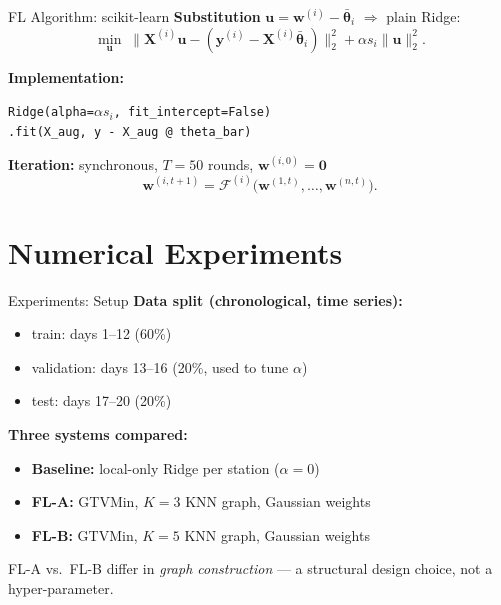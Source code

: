 \documentclass[12pt]{beamer}
\newcommand{\nodeidx}{i}
\newcommand{\nrnodes}{n}
\newcommand{\iteridx}{t}
\newcommand{\fixedpointop}{\mathcal{F}}
\newcommand{\featuremtx}{\mathbf{X}}
\newcommand{\labelvec}{\mathbf{y}}
\newcommand{\localparams}[1]{\mathbf{w}^{(#1)}}
\newcommand{\localparamsiter}[2]{\mathbf{w}^{(#1,#2)}}
\begin{document}
\begin{frame}{FL Algorithm: scikit-learn}
\textbf{Substitution} $\mathbf{u} = \localparams{\nodeidx} - \bar{\boldsymbol{\theta}}_{\nodeidx}$
$\Rightarrow$ plain Ridge:
\[
    \min_{\mathbf{u}}\;
    \bigl\|\featuremtx^{(\nodeidx)} \mathbf{u} - (\labelvec^{(\nodeidx)}
    - \featuremtx^{(\nodeidx)}\bar{\boldsymbol{\theta}}_{\nodeidx})\bigr\|_{2}^{2}
    + \alpha s_{\nodeidx}\|\mathbf{u}\|_{2}^{2}.
\]

\vspace{3mm}
\textbf{Implementation:}
\begin{center}
\texttt{Ridge(alpha=}$\alpha s_\nodeidx$\texttt{, fit\_intercept=False)}\\
\texttt{\;.fit(X\_aug, y - X\_aug @ theta\_bar)}
\end{center}

\vspace{3mm}
\textbf{Iteration:} synchronous, $T = 50$ rounds,
$\localparamsiter{\nodeidx}{0} = \mathbf{0}$
\[
    \localparamsiter{\nodeidx}{\iteridx+1}
    = \fixedpointop^{(\nodeidx)}\!\bigl(\localparamsiter{1}{\iteridx},\ldots,\localparamsiter{\nrnodes}{\iteridx}\bigr).
\]
\end{frame}


\section{Numerical Experiments}

\begin{frame}{Experiments: Setup}
\textbf{Data split (chronological, time series):}
\begin{itemize}\setlength{\itemsep}{2mm}
    \item train: days 1--12 (60\%)
    \item validation: days 13--16 (20\%, used to tune $\alpha$)
    \item test: days 17--20 (20\%)
\end{itemize}

\vspace{4mm}
\textbf{Three systems compared:}
\begin{itemize}\setlength{\itemsep}{2mm}
    \item \textbf{Baseline:} local-only Ridge per station ($\alpha = 0$)
    \item \textbf{FL-A:} GTVMin, $K\!=\!3$ KNN graph, Gaussian weights
    \item \textbf{FL-B:} GTVMin, $K\!=\!5$ KNN graph, Gaussian weights
\end{itemize}

\vspace{4mm}
FL-A vs.\ FL-B differ in \emph{graph construction} --- a structural design
choice, not a hyper-parameter.
\end{frame}
\end{document}
